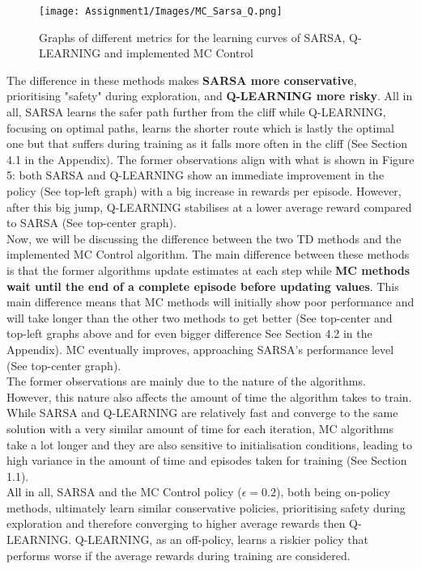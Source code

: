 \documentclass[11pt,a4paper]{article}
\begin{document}
\begin{figure}[h!]
    \centering
    \texttt{[image: Assignment1/Images/MC\_Sarsa\_Q.png]}
    \caption{Graphs of different metrics for the learning curves of SARSA, Q-LEARNING and implemented MC Control}
\end{figure}

The difference in these methods makes \textbf{SARSA more conservative}, prioritising "safety" during exploration, and \textbf{Q-LEARNING more risky}. All in all, SARSA learns the safer path further from the cliff while Q-LEARNING, focusing on optimal paths, learns the shorter route which is lastly the optimal one but that suffers during training as it falls more often in the cliff (See Section 4.1 in the Appendix). The former observations align with what is shown in Figure 5: both SARSA and Q-LEARNING show an immediate improvement in the policy (See top-left graph) with a big increase in rewards per episode. However, after this big jump, Q-LEARNING stabilises at a lower average reward compared to SARSA (See top-center graph). \\

\noindent Now, we will be discussing the difference between the two TD methods and the implemented MC Control algorithm. The main difference between these methods is that the former algorithms update estimates at each step while \textbf{MC methods wait until the end of a complete episode before updating values}. This main difference means that MC methods will initially show poor performance and will take longer than the other two methods to get better (See top-center and top-left graphs above and for even bigger difference See Section 4.2 in the Appendix). MC eventually improves, approaching SARSA's performance level (See top-center graph). \\


\noindent The former observations are mainly due to the nature of the algorithms. However, this nature also affects the amount of time the algorithm takes to train. While SARSA and Q-LEARNING are relatively fast and converge to the same solution with a very similar amount of time for each iteration, MC algorithms take a lot longer and they are also sensitive to initialisation conditions, leading to high variance in the amount of time and episodes taken for training (See Section 1.1).\\

\noindent All in all, SARSA and the MC Control policy ($\epsilon = 0.2$), both being on-policy methods, ultimately learn similar conservative policies, prioritising safety during exploration and therefore converging to higher average rewards then Q-LEARNING. Q-LEARNING, as an off-policy, learns a riskier policy that performs worse if the average rewards during training are considered. 
\end{document}
